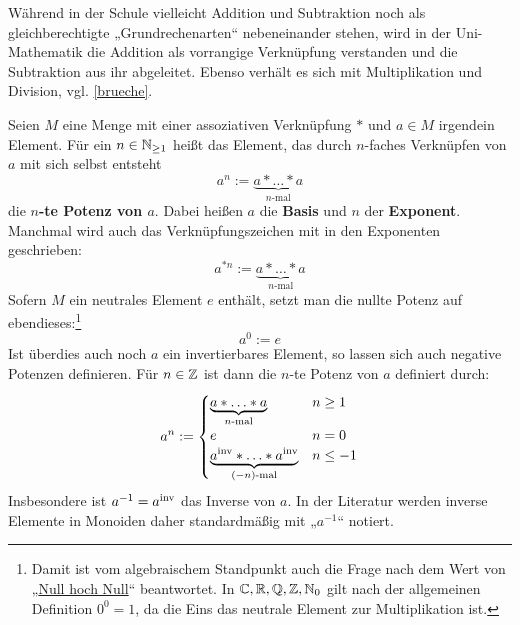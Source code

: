 \begin{bem}
    Während in der Schule vielleicht Addition und Subtraktion noch als gleichberechtigte „Grundrechenarten“ nebeneinander stehen, wird in der Uni-Mathematik die Addition als vorrangige Verknüpfung verstanden und die Subtraktion aus ihr abgeleitet. Ebenso verhält es sich mit Multiplikation und Division, vgl. \cref{brueche}.
\end{bem}


\begin{defin}[* Potenzen] \label{def:potenz}  
    Seien $M$ eine Menge mit einer assoziativen Verknüpfung $*$ und $a\in M$ irgendein Element. Für ein $n\in \mathbb N_{\ge 1}$ heißt das Element, das durch $n$-faches Verknüpfen von $a$ mit sich selbst entsteht
    \[ a^n := \underbrace{a * \ldots * a}_{n\text{-mal}} \]
    die \textbf{$n$-te Potenz von $a$}. Dabei heißen $a$ die \textbf{Basis} und $n$ der \textbf{Exponent}. Manchmal wird auch das Verknüpfungszeichen mit in den Exponenten geschrieben:
            \[ a^{*n} := \underbrace{a * \ldots * a}_{n\text{-mal}} \]
    Sofern $M$ ein neutrales Element $e$ enthält, setzt man die nullte Potenz auf ebendieses:\footnote{Damit ist vom algebraischem Standpunkt auch die Frage nach dem Wert von „\href{https://en.wikipedia.org/wiki/Zero_to_the_power_of_zero}{Null hoch Null}“ beantwortet. In $\mathbb C,\mathbb R,\mathbb Q,\mathbb Z,\mathbb N_0$ gilt nach der allgemeinen Definition $0^0=1$, da die Eins das neutrale Element zur Multiplikation ist.}
        \[ a^0 := e \]
    Ist überdies auch noch $a$ ein invertierbares Element, so lassen sich auch negative Potenzen definieren. Für $n\in \mathbb Z$ ist dann die $n$-te Potenz von $a$ definiert durch:
    \begin{align*}
        a^n := \begin{cases}
            \underbrace{a* \ldots * a}_{n\text{-mal}} & n \ge 1 \\
            e & n= 0 \\
            \underbrace{a^{\mathrm{inv}} * \ldots * a^{\mathrm{inv}}}_{(-n)\text{-mal}} & n \le -1
        \end{cases}
    \end{align*}
    Insbesondere ist $a^{-1}=a^{\mathrm{inv}}$ das Inverse von $a$. In der Literatur werden inverse Elemente in Monoiden daher standardmäßig mit „$a^{-1}$“ notiert.
\end{defin}

